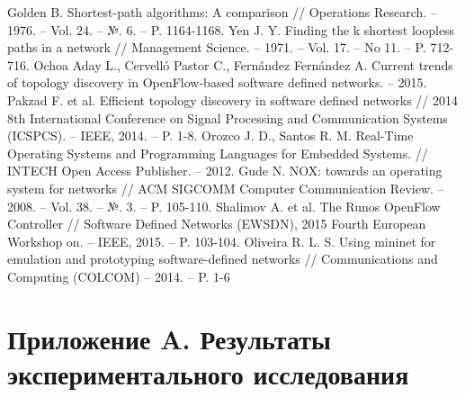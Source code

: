 \documentclass[12pt, a4paper]{article}
\begin{document}
\begin{thebibliography}{}
	Golden B. Shortest-path algorithms: A comparison // Operations Research. -- 1976. -- Vol. 24. -- №. 6. -- P. 1164-1168.
	Yen J. Y. Finding the k shortest loopless paths in a network // Management Science. -- 1971. -- Vol. 17. -- No 11. -- P. 712-716.
	Ochoa Aday L., Cervelló Pastor C., Fernández Fernández A. Current trends of topology discovery in OpenFlow-based software defined networks. -- 2015.
	Pakzad F. et al. Efficient topology discovery in software defined networks // 2014 8th International Conference on Signal Processing and Communication Systems (ICSPCS). -- IEEE, 2014. -- P. 1-8.
	Orozco J. D., Santos R. M. Real-Time Operating Systems and Programming Languages for Embedded Systems. // INTECH Open Access Publisher. -- 2012.
	Gude N. NOX: towards an operating system for networks // ACM SIGCOMM Computer Communication Review. -- 2008. -- Vol. 38. -- №. 3. -- P. 105-110.
	Shalimov A. et al. The Runos OpenFlow Controller // Software Defined Networks (EWSDN), 2015 Fourth European Workshop on. -- IEEE, 2015. -- P. 103-104.
	Oliveira R. L. S. Using mininet for emulation and prototyping software-defined networks // Communications and Computing (COLCOM) -- 2014. -- P. 1-6
\end{thebibliography}


\section*{Приложение A. Результаты экспериментального исследования} \label{sec:results}
\end{document}
